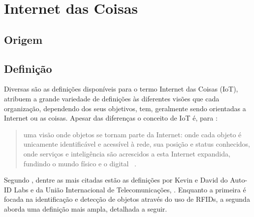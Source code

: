 \documentclass[twoside,english,brazilian]{UNISINOSmonografia}
\begin{document}
	\section{Internet das Coisas}
	
\subsection{Origem}

	
\subsection{Definição}
	
		Diversas são as definições disponíveis para o termo Internet das 
		Coisas (IoT),  atribuem a grande variedade de 
		definições às diferentes visões que cada organização, dependendo dos 
		seus objetivos, tem, geralmente sendo orientadas a Internet ou as 
		coisas. Apesar das diferenças o conceito de IoT é, para 
		:
		
		\begin{quote}
			uma visão onde objetos se tornam parte da Internet: onde cada 
			objeto é unicamente identificável e acessível à rede, sua posição 
			e status conhecidos, onde serviços e inteligência são acrescidos a 
			esta Internet expandida, fundindo o mundo físico e o digital~
			\cite{Coetzee2011}.
		\end{quote}
		
		Segundo , dentre as mais citadas estão as 
		definições por Kevin  e David 
		 do Auto-ID Labs e da União Internacional de 
		Telecomunicações, . Enquanto a primeira é focada na 
		identificação e detecção de objetos através do uso de RFIDs, a segunda 
		aborda uma definição mais ampla, detalhada a seguir.
		
\end{document}
